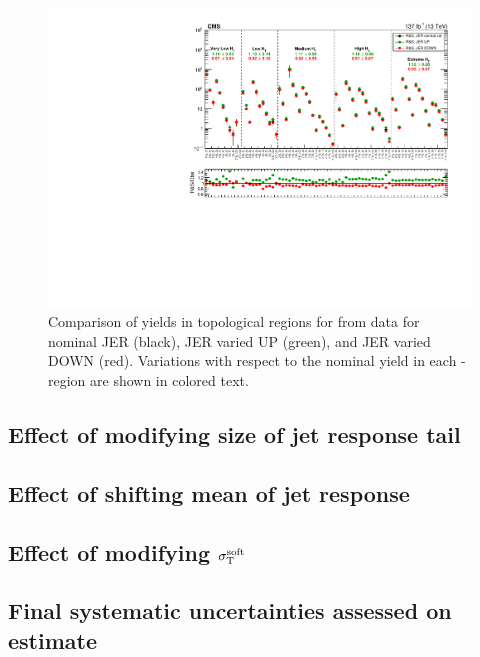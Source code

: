 \begin{figure}[htbp]
  \begin{center}
    \includegraphics[width=1.0\textwidth]{figs/qcd/rs_data/data_JER_systVar.pdf}
    \caption{Comparison of yields in topological regions for \rs from data for nominal JER (black), JER varied UP (green), and JER varied DOWN (red). Variations with respect to the nominal yield
      in each \Ht-region are shown in colored text.
            }
    \label{Fig:rs_data_JER_var}
  \end{center}
\end{figure}



\subsection{Effect of modifying size of jet response tail}
\label{sec:rs_jrt_tail}

\subsection{Effect of shifting mean of jet response}
\label{sec:rs_jrt_mean}

\subsection{Effect of modifying $\sigma_{\mathrm{T}}^{\mathrm{soft}}$}
\label{sec:rs_sigmasoft}

\subsection{Final systematic uncertainties assessed on estimate}
\label{sec:rs_finalsyst}
